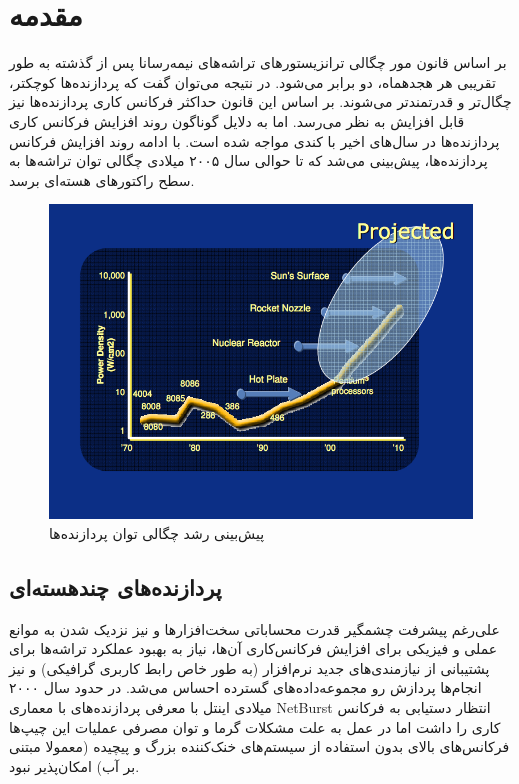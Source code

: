 \documentclass{thesis}
\begin{document}
\pagestyle{plain} 
\tableofcontents
\listoffigures
\cleardoublepage
\mainmatter \pagestyle{headings}\baselineskip

\chapter{%
مقدمه
}

بر اساس قانون مور
چگالی ترانزیستور‌های تراشه‌های نیمه‌رسانا
پس از گذشته به طور تقریبی هر هجدهماه، دو‌ برابر می‌شود. در نتیجه می‌توان گفت که
پردازنده‌ها کوچکتر‌، چگال‌تر و قدرتمند‌تر می‌شوند. بر اساس این قانون حداکثر
فرکانس‌ کاری پردازنده‌ها نیز قابل افزایش به نظر می‌رسد. اما به دلایل گوناگون
روند افزایش  فرکانس کاری پردازنده‌ها در سال‌های اخیر با کندی مواجه شده است.
با ادامه روند افزایش فرکانس پردازنده‌ها، پیش‌بینی می‌شد که تا حوالی سال ۲۰۰۵
میلادی چگالی توان تراشه‌ها به سطح راکتور‌های هسته‌ای برسد.

\begin{figure}[h]
\centering
\includegraphics[width=\textwidth]{./pics/1}
\caption{پیش‌بینی رشد چگالی توان پردازنده‌ها}
\end{figure}

\section{پردازنده‌های چندهسته‌ای}

علی‌رغم پیشرفت‌ چشمگیر قدرت محساباتی سخت‌افزار‌ها و نیز نزدیک‌ شدن به موانع
عملی و فیزیکی برای افزایش فرکانس‌کاری آن‌ها، نیاز به بهبود عملکرد 
تراشه‌ها برای پشتیبانی از نیازمندی‌های جدید نرم‌افزار (به طور خاص رابط کاربری
گرافیکی) و نیز انجام‌ها پردازش رو مجموعه‌داده‌های
 گسترده احساس می‌شد. 
در حدود سال ۲۰۰۰ میلادی اینتل
با معرفی پردازنده‌های با معماری
NetBurst
انتظار دستیابی به فرکانس کاری
را داشت اما در عمل به علت مشکلات گرما و توان مصرفی عملیات این چیپ‌ها فرکانس‌های
بالای
بدون استفاده از سیستم‌های خنک‌کننده بزرگ و پیچیده
(معمولا مبتنی بر آب)
امکان‌پذیر نبود.
\end{document}
